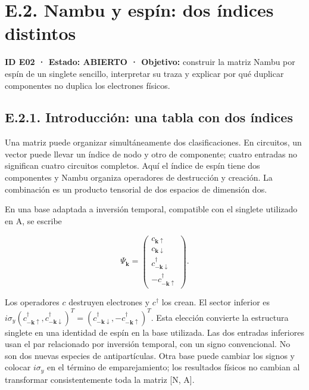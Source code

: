 \documentclass[
  spanish,
  10pt,
  a4paper,
]{article}
\begin{document}
\newpage

\section{E.2. Nambu y espín: dos índices
distintos}\label{e.2.-nambu-y-espuxedn-dos-uxedndices-distintos}

\textbf{ID E02 · Estado: ABIERTO · Objetivo:} construir la matriz Nambu
por espín de un singlete sencillo, interpretar su traza y explicar por
qué duplicar componentes no duplica los electrones físicos.

\subsection{E.2.1. Introducción: una tabla con dos
índices}\label{e.2.1.-introducciuxf3n-una-tabla-con-dos-uxedndices}

Una matriz puede organizar simultáneamente dos clasificaciones. En
circuitos, un vector puede llevar un índice de nodo y otro de
componente; cuatro entradas no significan cuatro circuitos completos.
Aquí el índice de espín tiene dos componentes y Nambu organiza
operadores de destrucción y creación. La combinación es un producto
tensorial de dos espacios de dimensión dos.

En una base adaptada a inversión temporal, compatible con el singlete
utilizado en A, se escribe

\[
\Psi_{\mathbf k}=\begin{pmatrix}
c_{\mathbf k\uparrow}\\c_{\mathbf k\downarrow}\\
c^\dagger_{-\mathbf k\downarrow}\\-c^\dagger_{-\mathbf k\uparrow}
\end{pmatrix}.
\tag{E.3}
\]

Los operadores \(c\) destruyen electrones y \(c^\dagger\) los crean. El
sector inferior es
\(i\sigma_y(c^\dagger_{-\mathbf k\uparrow},c^\dagger_{-\mathbf k\downarrow})^T=(c^\dagger_{-\mathbf k\downarrow},-c^\dagger_{-\mathbf k\uparrow})^T\).
Esta elección convierte la estructura singlete en una identidad de espín
en la base utilizada. Las dos entradas inferiores usan el par
relacionado por inversión temporal, con un signo convencional. No son
dos nuevas especies de antipartículas. Otra base puede cambiar los
signos y colocar \(i\sigma_y\) en el término de emparejamiento; los
resultados físicos no cambian al transformar consistentemente toda la
matriz {[}N, A{]}.
\end{document}
